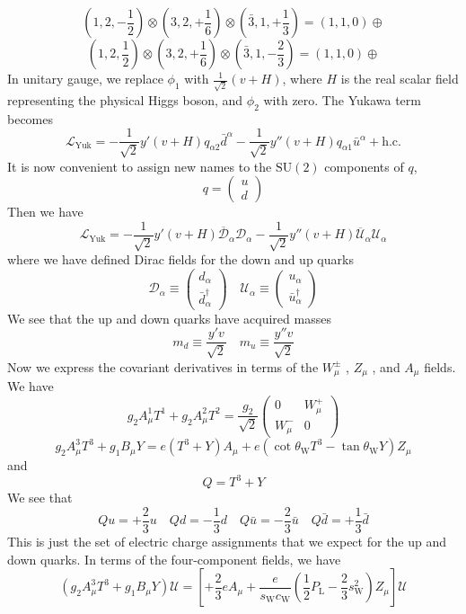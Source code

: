 \[(1,2,-\frac{1}{2}) \otimes (3, 2, +\frac{1}{6}) \otimes (\bar{3}, 1, +\frac{1}{3}) = (1,1,0) \oplus\]
\[(1,2, \frac{1}{2}) \otimes (3, 2, +\frac{1}{6}) \otimes (\bar{3}, 1, -\frac{2}{3}) = (1,1,0) \oplus\]
In unitary gauge, we replace $\phi_1$ with $\frac{1}{\sqrt{2}}(v+H)$, where $H$ is the real scalar field representing the physical Higgs boson, and $\phi_2$ with zero. The Yukawa term becomes
\[\mathcal{L}_{\mathrm{Yuk}} = -\frac{1}{\sqrt{2}}y'(v+H)q_{\alpha 2}\bar{d}^{\alpha} - \frac{1}{\sqrt{2}}y''(v+H)q_{\alpha 1}\bar{u}^{\alpha} + \mathrm{h.c.}\]
It is now convenient to assign new names to the $\mathrm{SU}(2)$ components of $q$,
\[q = \begin{pmatrix}
u \\ d
\end{pmatrix} \]
Then we have
\[\mathcal{L}_{\mathrm{Yuk}} = -\frac{1}{\sqrt{2}}y'(v+H) \overline{\mathcal{D}}_{\alpha}\mathcal{D}_{\alpha} -\frac{1}{\sqrt{2}}y''(v+H) \overline{\mathcal{U}}_{\alpha}\mathcal{U}_{\alpha}\]
where we have defined Dirac fields for the down and up quarks
\[\mathcal{D}_{\alpha} \equiv \begin{pmatrix}
d_{\alpha} \\ \bar{d}^{\dagger}_{\alpha}
\end{pmatrix} \quad  \mathcal{U}_{\alpha} \equiv \begin{pmatrix}
u_{\alpha} \\ \bar{u}^{\dagger}_{\alpha}
\end{pmatrix}\]
We see  that the up and down quarks have acquired masses
\[m_d \equiv \frac{y'v}{\sqrt{2}} \quad m_u \equiv \frac{y''v}{\sqrt{2}}\]
Now we express the covariant derivatives in terms of the $W_{\mu}^{\pm}$ , $Z_{\mu}$ , and $A_{\mu}$ fields. We have
\[g_2 A^1_{\mu}T^1 + g_2 A^2_{\mu}T^2 = \frac{g_2}{\sqrt{2}} \begin{pmatrix}
0 & W_{\mu}^+ \\ W^{-}_{\mu} & 0
\end{pmatrix} \]
\[g_2A^3_{\mu}T^3 + g_1 B_{\mu} Y = e(T^3+Y)A_{\mu} + e(\cot\theta_{\mathrm{W}} T^3 - \tan\theta_{\mathrm{W}} Y)Z_{\mu}\]
and
\[Q = T^3 + Y\]
We see that
\[Qu = +\frac{2}{3}u \quad Qd = -\frac{1}{3}d \quad Q\bar{u} = -\frac{2}{3}\bar{u} \quad Q\bar{d} = +\frac{1}{3}\bar{d}\]
This is just the set of electric charge assignments that we expect for the up and down quarks. In terms of the four-component fields, we have
\[(g_2A^3_{\mu}T^3 + g_1 B_{\mu} Y) \mathcal{U} = \left[ + \frac{2}{3}eA_{\mu} + \frac{e}{s_{\mathrm{W}} c_{\mathrm{W}}}( \frac{1}{2}P_{\mathrm{L}} -\frac{2}{3}  s_{\mathrm{W}}^2)Z_{\mu} \right] \mathcal{U}\]
